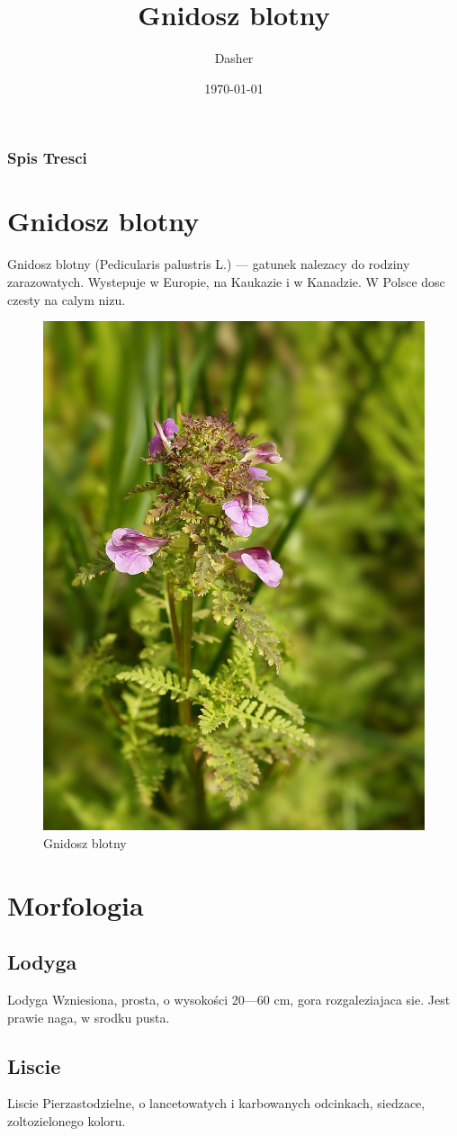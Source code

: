 \documentclass{beamer}
\title{Gnidosz blotny}
\author{Dasher}
\date{\today}
\begin{document}
\frame{\titlepage}

\begin{frame}
	\frametitle{Spis Tresci}
	\tableofcontents
\end{frame}

\section{Gnidosz blotny}
\begin{frame}{Gnidosz blotny}
(Pedicularis palustris L.) --- gatunek nalezacy do rodziny zarazowatych. Wystepuje w Europie, na Kaukazie i w Kanadzie. W Polsce dosc czesty na calym nizu.
\begin{figure}
\centering
\includegraphics[width=0.25\hsize]{kwiat.jpg}
\caption{Gnidosz blotny}
\end{figure}
\end{frame}

\section{Morfologia}
\subsection{Lodyga}
\begin{frame}{Lodyga}
Wzniesiona, prosta, o wysokości 20---60 cm, gora rozgaleziajaca sie. Jest prawie naga, w srodku pusta.
\end{frame}

\subsection{Liscie}
\begin{frame}{Liscie}
Pierzastodzielne, o lancetowatych i karbowanych odcinkach, siedzace, zoltozielonego koloru.
\end{frame}
\end{document}
